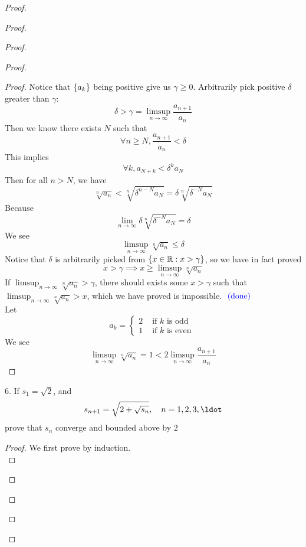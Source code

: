 \documentclass{report}
\begin{document}
\begin{proof}
\begin{proof}
\begin{proof}
\begin{proof}
\begin{proof}
Notice that $\{ a_k \}$ being positive give us $\gamma \geq 0$. Arbitrarily pick positive $\delta$ greater than $\gamma $:
\begin{equation}
\delta>\gamma =\limsup_{n\to\infty} \frac{a_{n+1}}{a_n}
\end{equation}
Then we know there exists $N$ such that
 \begin{equation}
\forall n\geq N, \frac{a_{n+1}}{a_n}<\delta 
\end{equation}
This implies
\begin{equation}
\forall k,a_{N+k}<\delta^k a_N
\end{equation}
Then for all $n>N$, we have
 \begin{equation}
\sqrt[n]{a_n}<\sqrt[n]{\delta^{n-N}a_N}=\delta \sqrt[n]{\delta^{-N}a_N} 
\end{equation}
Because
\begin{equation}
\lim_{n\to\infty}\delta \sqrt[n]{\delta ^{-N}a_N} =\delta 
\end{equation}
We see
\begin{equation}
\limsup_{n\to\infty} \sqrt[n]{a_n}\leq \delta 
\end{equation}
Notice that $\delta $ is arbitrarily picked from $\{ x\in\mathbb{R}:x>\gamma  \}$, so we have in fact proved
\begin{equation}
x>\gamma \implies x\geq \limsup_{n\to\infty} \sqrt[n]{a_n} 
\end{equation}
If $\limsup_{n\to\infty} \sqrt[n]{a_n} >\gamma $, there should exists some $x>\gamma $ such that $\limsup_{n\to\infty} \sqrt[n]{a_n}>x$, which we have proved is impossible. $\textcolor{blue}{\text{ (done) }}$\\

Let
\begin{equation}
a_k=\begin{cases}
  2& \text{ if  }k\text{ is odd }\\
  1& \text{ if $k$ is even }
\end{cases}
\end{equation}
We see 
\begin{equation}
\limsup_{n\to\infty} \sqrt[n]{a_n}=1 <2\limsup_{n\to\infty} \frac{a_{n+1}}{a_n}
\end{equation}
\end{proof}
\begin{question}{}{}
6. If $s_1 = \sqrt{2}$, and
\begin{equation}
s_{n+1} =  \sqrt{2+\sqrt{s_n}}, \quad n = 1, 2, 3, \ldot
\end{equation}
prove that $s_n$ converge and bounded above by $2$
\end{question}
\begin{proof}
We first prove  by induction.\\


\end{proof}
\end{proof}
\end{proof}
\end{proof}
\end{proof}
\end{document}
